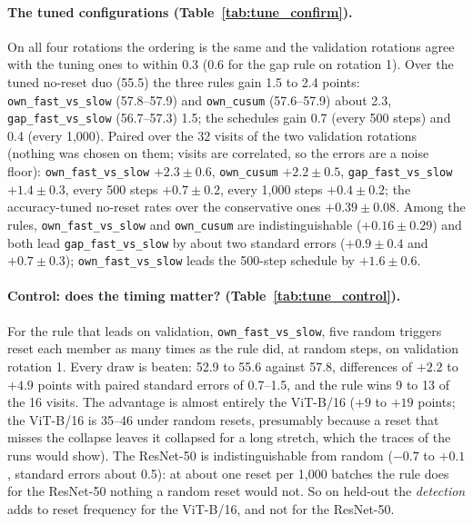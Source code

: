 \documentclass[10pt]{article}
\newcommand{\rl}[1]{\texttt{#1}}
\newcommand{\vit}{ViT-B/16}
\newcommand{\rn}{ResNet-50}
\begin{document}
\paragraph{The tuned configurations (Table~\ref{tab:tune_confirm}).} On all four rotations the ordering is the same and the validation rotations agree with the tuning ones to within 0.3 (0.6 for the gap rule on rotation 1). Over the tuned no-reset duo (55.5) the three rules gain 1.5 to 2.4 points: \rl{own\_fast\_vs\_slow} (57.8--57.9) and \rl{own\_cusum} (57.6--57.9) about 2.3, \rl{gap\_fast\_vs\_slow} (56.7--57.3) 1.5; the schedules gain 0.7 (every 500 steps) and 0.4 (every 1,000). Paired over the 32 visits of the two validation rotations (nothing was chosen on them; visits are correlated, so the errors are a noise floor): \rl{own\_fast\_vs\_slow} $+2.3 \pm 0.6$, \rl{own\_cusum} $+2.2 \pm 0.5$, \rl{gap\_fast\_vs\_slow} $+1.4 \pm 0.3$, every 500 steps $+0.7 \pm 0.2$, every 1,000 steps $+0.4 \pm 0.2$; the accuracy-tuned no-reset rates over the conservative ones $+0.39 \pm 0.08$. Among the rules, \rl{own\_fast\_vs\_slow} and \rl{own\_cusum} are indistinguishable ($+0.16 \pm 0.29$) and both lead \rl{gap\_fast\_vs\_slow} by about two standard errors ($+0.9 \pm 0.4$ and $+0.7 \pm 0.3$); \rl{own\_fast\_vs\_slow} leads the 500-step schedule by $+1.6 \pm 0.6$.



\paragraph{Control: does the timing matter? (Table~\ref{tab:tune_control}).} For the rule that leads on validation, \rl{own\_fast\_vs\_slow}, five random triggers reset each member as many times as the rule did, at random steps, on validation rotation 1. Every draw is beaten: 52.9 to 55.6 against 57.8, differences of $+2.2$ to $+4.9$ points with paired standard errors of 0.7--1.5, and the rule wins 9 to 13 of the 16 visits. The advantage is almost entirely the \vit{} ($+9$ to $+19$ points; the \vit{} is 35--46 under random resets, presumably because a reset that misses the collapse leaves it collapsed for a long stretch, which the traces of the runs would show). The \rn{} is indistinguishable from random ($-0.7$ to $+0.1$, standard errors about 0.5): at about one reset per 1,000 batches the rule does for the \rn{} nothing a random reset would not. So on held-out the \emph{detection} adds to reset frequency for the \vit{}, and not for the \rn{}.
\end{document}

